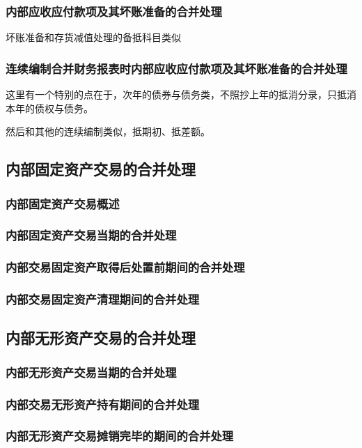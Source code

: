 \documentclass[UTF8,12pt]{ctexart}
\numberwithin{equation}{section} %
\numberwithin{figure}{section}
\numberwithin{table}{section}
\begin{document}
	\subsubsection{内部应收应付款项及其坏账准备的合并处理}
	坏账准备和存货减值处理的备抵科目类似
	
	\subsubsection{连续编制合并财务报表时内部应收应付款项及其坏账准备的合并处理}
	这里有一个特别的点在于，次年的债券与债务类，不照抄上年的抵消分录，只抵消本年的债权与债务。
	
	然后和其他的连续编制类似，抵期初、抵差额。
	
	\subsection{内部固定资产交易的合并处理}
	\subsubsection{内部固定资产交易概述}
	\subsubsection{内部固定资产交易当期的合并处理}
	\subsubsection{内部交易固定资产取得后处置前期间的合并处理}
	\subsubsection{内部交易固定资产清理期间的合并处理}
	
	\subsection{内部无形资产交易的合并处理}
	\subsubsection{内部无形资产交易当期的合并处理}
	\subsubsection{内部交易无形资产持有期间的合并处理}
	\subsubsection{内部无形资产交易摊销完毕的期间的合并处理}
	
\end{document}
